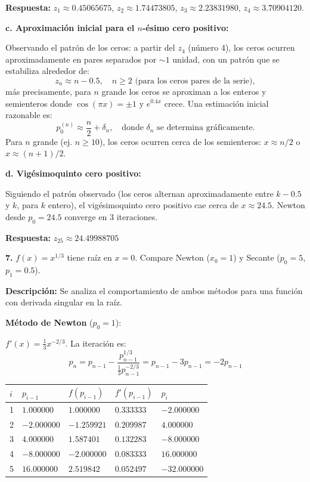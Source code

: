 \documentclass[12pt,a4paper]{article}
\begin{document}
\textbf{Respuesta:} $z_1 \approx \boxed{0.45065675}$, $z_2 \approx \boxed{1.74473805}$, $z_3 \approx \boxed{2.23831980}$, $z_4 \approx \boxed{3.70904120}$.

\textbf{c. Aproximaci\'on inicial para el $n$-\'esimo cero positivo:}

Observando el patr\'on de los ceros: a partir del $z_4$ (n\'umero 4), los ceros ocurren aproximadamente en pares separados por $\sim 1$ unidad, con un patr\'on que se estabiliza alrededor de:
\[
z_n \approx n - 0.5, \quad n \geq 2 \text{ (para los ceros pares de la serie)},
\]
m\'as precisamente, para $n$ grande los ceros se aproximan a los enteros y semienteros donde $\cos(\pi x) = \pm 1$ y $e^{0.4x}$ crece. Una estimaci\'on inicial razonable es:
\[
p_0^{(n)} \approx \frac{n}{2} + \delta_n, \quad \text{donde } \delta_n \text{ se determina gr\'aficamente.}
\]
Para $n$ grande (ej. $n \geq 10$), los ceros ocurren cerca de los semienteros: $x \approx n/2$ o $x \approx (n+1)/2$.

\textbf{d. Vig\'esimoquinto cero positivo:}

Siguiendo el patrón observado (los ceros alternan aproximadamente entre $k - 0.5$ y $k$, para $k$ entero), el vig\'esimoquinto cero positivo cae cerca de $x \approx 24.5$. Newton desde $p_0 = 24.5$ converge en 3 iteraciones.

\textbf{Respuesta:} $z_{25} \approx \boxed{24.49988705}$

\vspace{0.4cm}

\textbf{7.} $f(x) = x^{1/3}$ tiene ra\'iz en $x = 0$. Compare Newton ($x_0 = 1$) y Secante ($p_0 = 5$, $p_1 = 0.5$).

\textbf{Descripci\'on:} Se analiza el comportamiento de ambos m\'etodos para una funci\'on con derivada singular en la ra\'iz.

\textbf{M\'etodo de Newton} ($p_0 = 1$):

$f'(x) = \frac{1}{3}x^{-2/3}$. La iteraci\'on es:
\[
p_n = p_{n-1} - \frac{p_{n-1}^{1/3}}{\frac{1}{3}p_{n-1}^{-2/3}} = p_{n-1} - 3p_{n-1} = -2p_{n-1}
\]

\begin{center}\small
\begin{tabular}{C{0.5cm}C{2.0cm}C{2.0cm}C{2.0cm}C{2.0cm}}
\toprule
$i$ & $p_{i-1}$ & $f(p_{i-1})$ & $f'(p_{i-1})$ & $p_i$ \\
 & $1.000000$ & $1.000000$ & $0.333333$ & $-2.000000$ \\
2 & $-2.000000$ & $-1.259921$ & $0.209987$ & $4.000000$ \\
3 & $4.000000$ & $1.587401$ & $0.132283$ & $-8.000000$ \\
4 & $-8.000000$ & $-2.000000$ & $0.083333$ & $16.000000$ \\
5 & $16.000000$ & $2.519842$ & $0.052497$ & $-32.000000$ \\
\bottomrule
\end{tabular}
\end{center}
\end{document}
